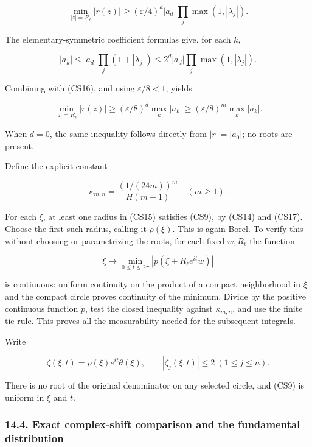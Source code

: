 \documentclass[
  11pt,
]{article}
\makeatletter
\let\ReaderOriginalAnchorStart\hyper@anchorstart
\let\ReaderOriginalAnchorEnd\hyper@anchorend
\let\ReaderPendingAliases\@empty
\def\ReaderArmAliases#1{\gdef\ReaderPendingAliases{#1}}
\def\hyper@anchorstart#1{\ReaderIfNativeAnchorTF{#1}{\ReaderPendingAliases\global\let\ReaderPendingAliases\@empty}{}\ReaderOriginalAnchorStart{#1}}
\makeatother
\begin{document}
\[
 \min_{|z|=R_\ell}|r(z)|
 \geq(\varepsilon/4)^d|a_d|\prod_j\max(1,|\lambda_j|).
                                                                    \tag{CS16}
\]

The elementary-symmetric coefficient formulas give, for each \(k\),

\[
 |a_k|\leq|a_d|\prod_j(1+|\lambda_j|)
          \leq2^d|a_d|\prod_j\max(1,|\lambda_j|).
\]

Combining with (CS16), and using \(\varepsilon/8<1\), yields

\[
 \min_{|z|=R_\ell}|r(z)|
       \geq(\varepsilon/8)^d\max_k|a_k|
       \geq(\varepsilon/8)^m\max_k|a_k|.                        \tag{CS17}
\]

When \(d=0\), the same inequality follows directly from \(|r|=|a_0|\);
no roots are present.

Define the explicit constant

\[
 \kappa_{m,n}=\frac{(1/(24m))^m}{H(m+1)}
             \quad(m\geq1).                                  \tag{CS18}
\]

For each \(\xi\), at least one radius in (CS15) satisfies (CS9), by
(CS14) and (CS17). Choose the first such radius, calling it
\(\rho(\xi)\). This is again Borel. To verify this without choosing or
parametrizing the roots, for each fixed \(w,R_\ell\) the function

\[
 \xi\longmapsto\min_{0\leq t\leq2\pi}|p(\xi+R_\ell e^{it}w)|
\]

is continuous: uniform continuity on the product of a compact
neighborhood in \(\xi\) and the compact circle proves continuity of the
minimum. Divide by the positive continuous function \(\widetilde p\),
test the closed inequality against \(\kappa_{m,n}\), and use the finite
tie rule. This proves all the measurability needed for the subsequent
integrals.

Write

\[
 \zeta(\xi,t)=\rho(\xi)e^{it}\theta(\xi),
 \qquad |\zeta_j(\xi,t)|\leq2\ (1\leq j\leq n).                \tag{CS19}
\]

There is no root of the original denominator on any selected circle, and
(CS9) is uniform in \(\xi\) and \(t\).

\ReaderArmAliases{\ReaderOriginalAnchorStart{exact-complex-shift-comparison-and-the-fundamental-distribution}\ReaderOriginalAnchorEnd}
\subsubsection{14.4. Exact complex-shift comparison and the fundamental
distribution}\label{exact-complex-shift-comparison-and-the-fundamental-distribution}
\end{document}
